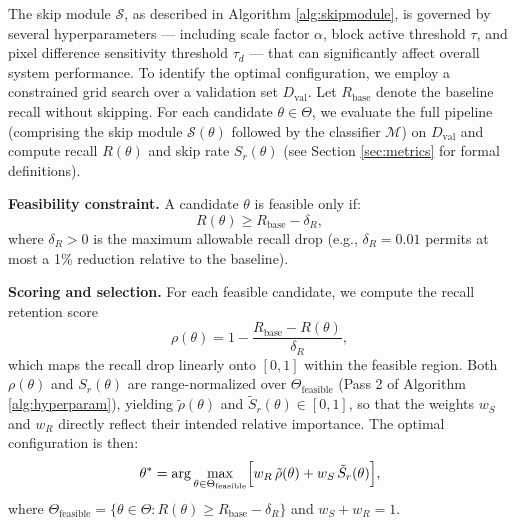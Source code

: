 The skip module $\mathcal{S}$, as described in Algorithm \ref{alg:skipmodule},
is governed by several hyperparameters --- including scale factor $\alpha$,
block active threshold $\tau$, and pixel difference sensitivity threshold
$\tau_d$ --- that can significantly affect overall system performance. To
identify the optimal configuration, we employ a constrained grid search over a
validation set $D_{\text{val}}$. Let $R_{\text{base}}$ denote the baseline
recall without skipping. For each candidate $\theta \in \Theta$, we evaluate the
full pipeline (comprising the skip module $\mathcal{S}(\theta)$ followed by the
classifier $\mathcal{M}$) on $D_{\text{val}}$ and compute recall $R(\theta)$ and
skip rate $S_r(\theta)$ (see Section \ref{sec:metrics} for formal definitions).

\textbf{Feasibility constraint.} A candidate $\theta$ is feasible only if:
\begin{equation}
    R(\theta) \geq R_{\text{base}} - \delta_R,
\end{equation}
where $\delta_R > 0$ is the maximum allowable recall drop (e.g.,
$\delta_R = 0.01$ permits at most a 1\% reduction relative to the baseline).

\textbf{Scoring and selection.} For each feasible candidate, we compute the
recall retention score
\begin{equation}\label{eq:rho}
    \rho(\theta) = 1 - \frac{R_{\text{base}} - R(\theta)}{\delta_R},
\end{equation}
which maps the recall drop linearly onto $[0,1]$ within the feasible region.
Both $\rho(\theta)$ and $S_r(\theta)$ are range-normalized over
$\Theta_{\text{feasible}}$ (Pass 2 of Algorithm \ref{alg:hyperparam}),
yielding $\tilde{\rho}(\theta)$ and $\tilde{S}_r(\theta) \in [0,1]$, so that
the weights $w_S$ and $w_R$ directly reflect their intended relative importance.
The optimal configuration is then:
\begin{equation}
    \theta^*
    = \arg\max_{\theta \in \Theta_{\text{feasible}}}
    \Bigl[ w_R\,\tilde{\rho}(\theta) + w_S\,\tilde{S}_r(\theta) \Bigr],
\end{equation}
where $\Theta_{\text{feasible}} = \{\theta \in \Theta : R(\theta) \geq
R_{\text{base}} - \delta_R\}$ and $w_S + w_R = 1$.

